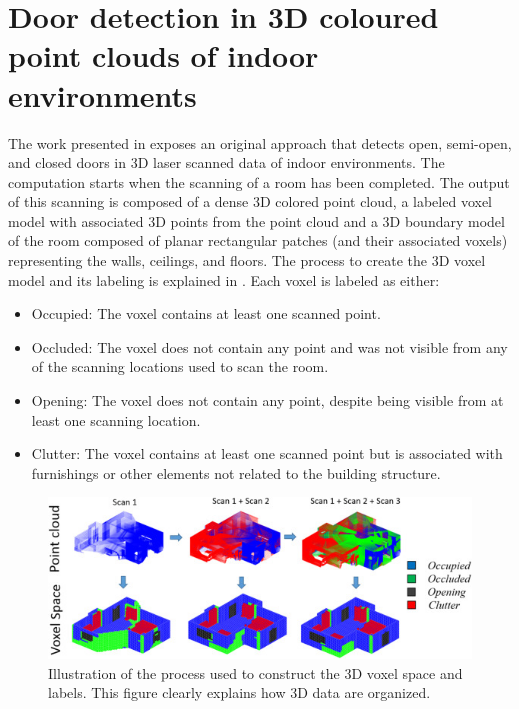\newpage

\section{Door detection in 3D coloured point clouds of indoor environments \cite{QUINTANA2018146}}

The work presented in \cite{QUINTANA2018146} exposes an original approach that detects open, semi-open, and closed doors in 3D laser scanned data of indoor environments. The computation starts when the scanning of a room has been completed. The output of
this scanning is composed of a dense 3D colored point cloud, a labeled voxel model with associated 3D points from the point cloud and a 3D boundary model of the room composed of planar rectangular patches (and their associated voxels) representing the
walls, ceilings, and floors. The process to create the 3D voxel model and its labeling is explained in \cite{QUINTANA2016643}. Each voxel is labeled as either: 
\begin{itemize}
\item Occupied: The voxel contains at least one scanned point.
\item Occluded: The voxel does not contain any point and was not visible
from any of the scanning locations used to scan the room.
\item Opening: The voxel does not contain any point, despite being visible
from at least one scanning location.
\item Clutter: The voxel contains at least one scanned point but is associated with furnishings or other elements not related to the building structure.
\end{itemize}

\begin{figure}[h!]
	\centering
	\includegraphics[width=0.80\linewidth]{images/3Dvoxel.jpg}
	\caption{Illustration of the process used to construct the
		3D voxel space and labels. This figure clearly explains how 3D data are organized.}
\end{figure}

